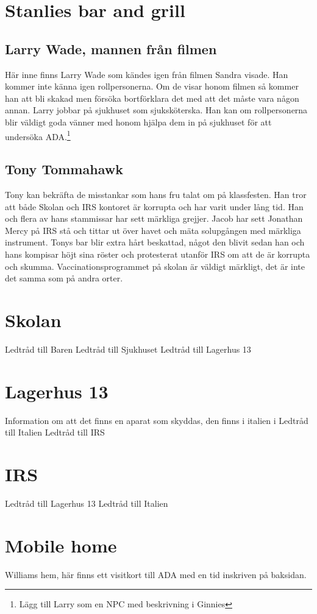 \section{Stanlies bar and grill}
\subsection{Larry Wade, mannen från filmen}
Här inne finns Larry Wade som kändes igen från filmen Sandra visade. Han kommer inte känna igen rollpersonerna. Om de visar honom filmen så kommer han att bli skakad men försöka bortförklara det med att det måste vara någon annan. Larry jobbar på sjukhuset som sjuksköterska. Han kan om rollpersonerna blir väldigt goda vänner med honom hjälpa dem in på sjukhuset för att undersöka ADA.\footnote{Lägg till Larry som en NPC med beskrivning i Ginnies}
\subsection{Tony Tommahawk}
Tony kan bekräfta de misstankar som hans fru talat om på klassfesten. Han tror att både Skolan och IRS kontoret är korrupta och har varit under lång tid. Han och flera av hans stammissar har sett märkliga grejjer. Jacob har sett Jonathan Mercy på IRS stå och tittar ut över havet och mäta solupgången med märkliga instrument. Tonys bar blir extra hårt beskattad, något den blivit sedan han och hans kompisar höjt sina röster och protesterat utanför IRS om att de är korrupta och skumma. Vaccinationsprogrammet på skolan är väldigt märkligt, det är inte det samma som på andra orter.
\section{Skolan}
Ledtråd till Baren
Ledtråd till Sjukhuset
Ledtråd till Lagerhus 13
\section{Lagerhus 13}
Information om att det finns en aparat som skyddas, den finns i italien i
Ledtråd till Italien
Ledtråd till IRS
\section{IRS}
Ledtråd till Lagerhus 13
Ledtråd till Italien
\section{Mobile home}
Williams hem, här finns ett visitkort till ADA med en tid inskriven på baksidan.
